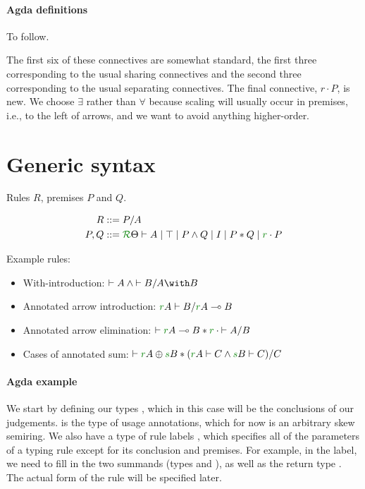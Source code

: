 \documentclass[a4paper]{article}
\begin{document}
\paragraph{Agda definitions}
To follow.

The first six of these connectives are somewhat standard, the first three
corresponding to the usual sharing connectives and the second three
corresponding to the usual separating connectives.
The final connective, $r \cdot P$, is new.
We choose $\exists$ rather than $\forall$ because scaling will usually occur in
premises, i.e., to the left of arrows, and we want to avoid anything
higher-order.

\section{Generic syntax}

Rules $R$, premises $P$ and $Q$.

\begin{align*}
  R &::= P/A \\
  P,Q &::= \ctx \Theta R \vdash A \mid \top \mid P \wedge Q \mid I \mid P * Q
        \mid \rescomment r \cdot P
\end{align*}

Example rules:

\begin{itemize}
  \item With-introduction: ${\vdash A} \wedge {\vdash B} / \withT{A}{B}$
  \item Annotated arrow introduction:
    ${\rescomment rA \vdash B} / \fun{\rescomment rA}{B}$
  \item Annotated arrow elimination:
    ${\vdash \fun{\rescomment rA}{B}} * \rescomment r \cdot {\vdash A} / B$
  \item Cases of annotated sum:
    ${\vdash \sumT{\rescomment rA}{\rescomment sB}}
    * ({\rescomment rA \vdash C} \wedge {\rescomment sB \vdash C}) / C$
\end{itemize}

\paragraph{Agda example}

We start by defining our types , which in this case will be the
conclusions of our judgements.
 is the type of usage annotations, which for now is an
arbitrary skew semiring.
We also have a type of rule labels , which specifies all of
the parameters of a typing rule except for its conclusion and premises.
For example, in the  label, we need to fill in
the two summands (types  and ), as well as the return
type .
The actual form of the rule will be specified later.
\end{document}
